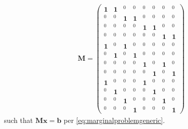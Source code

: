 \documentclass[aps,english,10pt,superscriptaddress,onecolumn,twoside,longbibliography,pra,floatfix,fleqn,nofootinbib]{revtex4-1}
\theoremstyle{definition}
\begin{document}
\begin{align}
\bm{M}=\begin{pmatrix}
 \bm{1} & \bm{1} & {\scriptscriptstyle ^0} & {\scriptscriptstyle ^0} & {\scriptscriptstyle ^0} & {\scriptscriptstyle ^0} & {\scriptscriptstyle ^0} & {\scriptscriptstyle ^0} \\
 {\scriptscriptstyle ^0} & {\scriptscriptstyle ^0} & \bm{1} & \bm{1} & {\scriptscriptstyle ^0} & {\scriptscriptstyle ^0} & {\scriptscriptstyle ^0} & {\scriptscriptstyle ^0} \\
 {\scriptscriptstyle ^0} & {\scriptscriptstyle ^0} & {\scriptscriptstyle ^0} & {\scriptscriptstyle ^0} & \bm{1} & \bm{1} & {\scriptscriptstyle ^0} & {\scriptscriptstyle ^0} \\
 {\scriptscriptstyle ^0} & {\scriptscriptstyle ^0} & {\scriptscriptstyle ^0} & {\scriptscriptstyle ^0} & {\scriptscriptstyle ^0} & {\scriptscriptstyle ^0} & \bm{1} & \bm{1} \\
 \bm{1} & {\scriptscriptstyle ^0} & \bm{1} & {\scriptscriptstyle ^0} & {\scriptscriptstyle ^0} & {\scriptscriptstyle ^0} & {\scriptscriptstyle ^0} & {\scriptscriptstyle ^0} \\
 {\scriptscriptstyle ^0} & \bm{1} & {\scriptscriptstyle ^0} & \bm{1} & {\scriptscriptstyle ^0} & {\scriptscriptstyle ^0} & {\scriptscriptstyle ^0} & {\scriptscriptstyle ^0} \\
 {\scriptscriptstyle ^0} & {\scriptscriptstyle ^0} & {\scriptscriptstyle ^0} & {\scriptscriptstyle ^0} & \bm{1} & {\scriptscriptstyle ^0} & \bm{1} & {\scriptscriptstyle ^0} \\
 {\scriptscriptstyle ^0} & {\scriptscriptstyle ^0} & {\scriptscriptstyle ^0} & {\scriptscriptstyle ^0} & {\scriptscriptstyle ^0} & \bm{1} & {\scriptscriptstyle ^0} & \bm{1} \\
 \bm{1} & {\scriptscriptstyle ^0} & {\scriptscriptstyle ^0} & {\scriptscriptstyle ^0} & \bm{1} & {\scriptscriptstyle ^0} & {\scriptscriptstyle ^0} & {\scriptscriptstyle ^0} \\
 {\scriptscriptstyle ^0} & \bm{1} & {\scriptscriptstyle ^0} & {\scriptscriptstyle ^0} & {\scriptscriptstyle ^0} & \bm{1} & {\scriptscriptstyle ^0} & {\scriptscriptstyle ^0} \\
 {\scriptscriptstyle ^0} & {\scriptscriptstyle ^0} & \bm{1} & {\scriptscriptstyle ^0} & {\scriptscriptstyle ^0} & {\scriptscriptstyle ^0} & \bm{1} & {\scriptscriptstyle ^0} \\
 {\scriptscriptstyle ^0} & {\scriptscriptstyle ^0} & {\scriptscriptstyle ^0} & \bm{1} & {\scriptscriptstyle ^0} & {\scriptscriptstyle ^0} & {\scriptscriptstyle ^0} & \bm{1} 
\end{pmatrix}
\end{align}
such that $\bm{M}\bm{x}=\bm{b}$ per \cref{eq:marginalproblemgeneric}.
\end{document}
